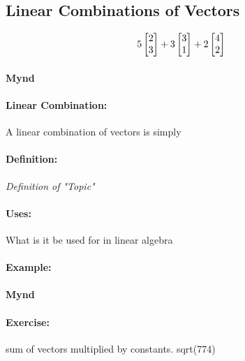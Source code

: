 \documentclass{article}
\begin{document}
\color{white}
\subsection{Linear Combinations of Vectors}
\color{black}

\begin{equation}
5 \left[\begin{matrix}2\\3\end{matrix}\right] + 3\left[\begin{matrix}3\\1\end{matrix}\right] + 2\left[\begin{matrix}4\\2\end{matrix}\right]
\end{equation}

\paragraph{Mynd} 

\paragraph{Linear Combination:} A linear combination of vectors is simply 

\color{theorem} \paragraph{Definition:} \textit{Definition of "Topic"} \color{black} 

\paragraph{Uses:} What is it be used for in linear algebra

\paragraph{Example:} 

\paragraph{Mynd} 

\paragraph{Exercise:} 

sum of vectors multiplied by constants. 
sqrt(774)
\end{document}
